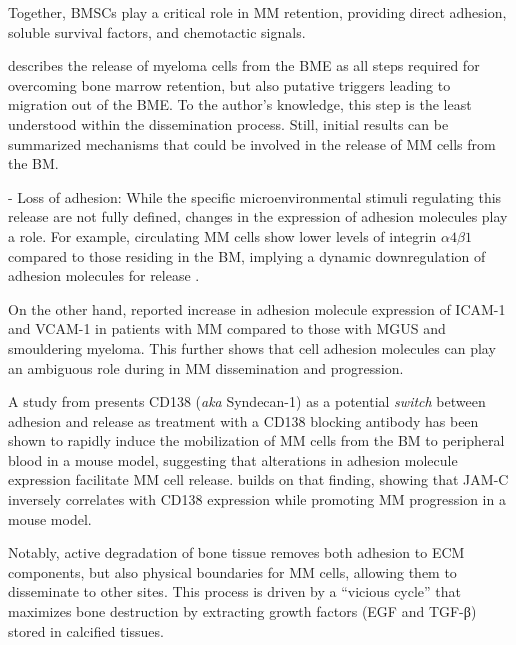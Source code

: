 Together, BMSCs play a critical role in MM retention, providing direct
adhesion, soluble survival factors, and chemotactic signals.


%
\label{sec:intro_myeloma_release}%
\citet{zeissigTumourDisseminationMultiple2020} describes the release of myeloma
cells from the BME as all steps required for overcoming bone marrow retention,
but also putative triggers leading to migration out of the BME. To the author's
knowledge, this step is the least understood within the dissemination process.
Still, initial results can be summarized mechanisms that could be involved in
the release of MM cells from the BM.

- Loss of adhesion: While the specific microenvironmental stimuli regulating
this release are not fully defined, changes in the expression of adhesion
molecules play a role. For example, circulating MM cells show lower levels of
integrin $\alpha4\beta1$ compared to those residing in the BM, implying a
dynamic downregulation of adhesion molecules for release
\cite{paivaDetailedCharacterizationMultiple2013,
    paivaCompetitionClonalPlasma2011}.

On the other hand, \citet{terposIncreasedCirculatingVCAM12016} reported
increase in adhesion molecule expression of ICAM-1 and VCAM-1 in patients with MM
compared to those with MGUS and smouldering myeloma. This further shows that
cell adhesion molecules can play an ambiguous role during in MM dissemination
and progression.

A study from \citet{akhmetzyanovaDynamicCD138Surface2020} presents CD138
(\textit{aka} Syndecan-1) as a potential \textit{switch} between adhesion and
release as treatment with a CD138 blocking antibody has been shown to rapidly
induce the mobilization of MM cells from the BM to peripheral blood in a mouse
model, suggesting that alterations in adhesion molecule expression facilitate MM
cell release. \citet{brandlJunctionalAdhesionMolecule2022} builds on that
finding, showing that JAM-C inversely correlates with CD138 expression while
promoting MM progression in a mouse model.



Notably, active degradation of bone tissue removes both adhesion to ECM
components, but also physical boundaries for MM
cells, allowing them to disseminate to other sites.
This process is driven by a
``vicious cycle'' that maximizes bone destruction by extracting growth factors
(EGF and TGF-β) stored in calcified tissues.



